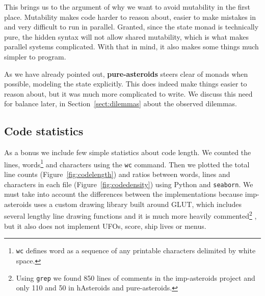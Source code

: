 \documentclass[
  digital, %
  color,   %
  table,   %
  oneside, %
  lof,     %
  lot,     %
]{fithesis3}
\newcommand{\packagename}{\texttt}
\begin{document}
{This brings us to the argument of why we want to avoid mutability in the first place.
Mutability makes code harder to reason about, easier to make mistakes in and
very difficult to run in parallel. Granted, since the state monad is technically
pure, the hidden syntax will not allow shared mutability,
which is what makes parallel systems complicated.
With that in mind, it also makes some things much simpler to program.

As we have already pointed out, \textbf{pure-asteroids} steers clear of monads when possible,
modeling the state explicitly. This does indeed make things easier to reason about,
but it was much more complicated to write.
We discuss this need for balance later, in Section~\ref{sect:dilemmas} about the observed dilemmas.



\subsection{Code statistics}
\label{sect:codestats}

As a bonus we include few simple statistics about code length.
We counted the lines, words\footnote{
\texttt{wc} defines word
as a sequence of any printable characters delimited by white space.
}
and characters using the \texttt{wc} command.
Then we plotted the total line counts (Figure~\ref{fig:codelength}) and
ratios between words, lines and characters in each file (Figure~\ref{fig:codedensity})
using Python and \packagename{seaborn}. We must take into account the differences between
the implementations because imp-asteroids uses a custom drawing library
built around GLUT, which includes several lengthy line drawing functions and
it is much more heavily commented\footnote{
Using \texttt{grep} we found 850 lines of comments in the imp-asteroids project
and only 110 and 50 in hAsteroids and pure-asteroids.
}
, but it also does not implement UFOs, score, ship lives or menus.

}
\end{document}
